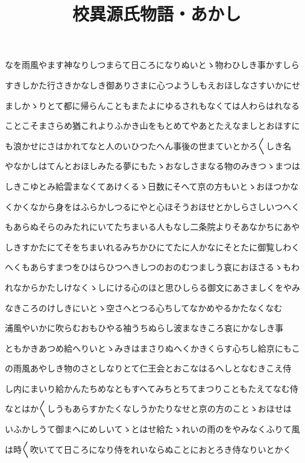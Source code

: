 \documentclass[a4paper,11pt,landscape]{ltjtarticle}
\title{校異源氏物語・あかし}
\date{}
\begin{document}
\maketitle

なを雨風やます神なりしつまらて日ころになりぬいとゝ物わひしき事かすしら
\par\medskip
すきしかた行さきかなしき御ありさまに心つようしもえおほしなさすいかにせ
\par\medskip
ましかゝりとて都に帰らんこともまたよにゆるされもなくては人わらはれなる
\par\medskip
ことこそまさらめ猶これよりふかき山をもとめてやあとたえなましとおほすに
\par\medskip
も浪かせにさはかれてなと人のいひつたへん事後の世まていとかろ〱しき名
\par\medskip
やなかしはてんとおほしみたる夢にもたゝおなしさまなる物のみきつゝまつは
\par\medskip
しきこゆとみ給雲まなくてあけくるゝ日数にそへて京の方もいとゝおほつかな
\par\medskip
くかくなから身をはふらかしつるにやと心ほそうおほせとかしらさしいつへく
\par\medskip
もあらぬそらのみたれにいてたちまいる人もなし二条院よりそあなかちにあや
\par\medskip
しきすかたにてそをちまいれるみちかひにてたに人かなにそとたに御覧しわく
\par\medskip
へくもあらすまつをひはらひつへきしつのおのむつましう哀におほさるゝもわ
\par\medskip
れなからかたしけなくゝしにける心のほと思ひしらる御文にあさましくをやみ
\par\medskip
なきころのけしきにいとゝ空さへとつる心ちしてなかめやるかたなくなむ
\par\medskip
浦風やいかに吹らむおもひやる袖うちぬらし波まなきころ哀にかなしき事
\par\medskip
ともかきあつめ給へりいとゝみきはまさりぬへくかきくらす心ちし給京にもこ
\par\medskip
の雨風あやしき物のさとしなりとて仁王会とおこなはるへしとなむきこえ侍
\par\medskip
し内にまいり給かんたちめなともすへてみちとちてまつりこともたえてなむ侍
\par\medskip
なとはか〱しうもあらすかたくなしうかたりなせと京の方のことゝおほせは
\par\medskip
いふかしうて御まへにめしいてゝとはせ給たゝれいの雨のをやみなくふりて風
\par\medskip
は時〱吹いてて日ころになり侍をれいならぬことにおとろき侍なりいとかく
\end{document}
